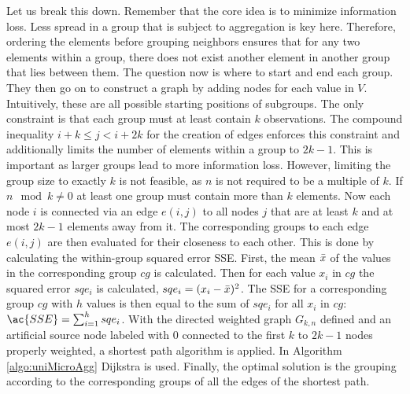 Let us break this down. Remember that the core idea is to minimize information loss. Less spread in a group that is subject to aggregation is key here. Therefore, ordering the elements before grouping neighbors ensures that for any two elements within a group, there does not exist another element in another group that lies between them. The question now is where to start and end each group. They then go on to construct a graph by adding nodes for each value in $V$. Intuitively, these are all possible starting positions of subgroups. The only constraint is that each group must at least contain $k$ observations. The compound inequality $i + k \leq j < i + 2k$ for the creation of edges enforces this constraint and additionally limits the number of elements within a group to $2k - 1$. This is important as larger groups lead to more information loss. However, limiting the group size to exactly $k$ is not feasible, as $n$ is not required to be a multiple of $k$. If $n \mod k \neq 0$ at least one group must contain more than $k$ elements. Now each node $i$ is connected via an edge $e(i,j)$ to all nodes $j$ that are at least $k$ and at most $2k - 1$ elements away from it. The corresponding groups to each edge $e(i,j)$ are then evaluated for their closeness to each other. This is done by calculating the within-group squared error \ac{SSE}. First, the mean $\bar{x}$ of the values in the corresponding group $cg$ is calculated. Then for each value $x_{i}$ in $cg$ the squared error $sqe_i$ is calculated, $sqe_i = (x_i - \bar{x})^2$. The \ac{SSE} for a corresponding group $cg$ with $h$ values is then equal to the sum of $sqe_i$ for all $x_{i}$ in $cg$: $\ac{SSE} = \sum_{i=1}^{h}sqe_i$. With the directed weighted graph $G_{k,n}$ defined and an artificial source node labeled with $0$ connected to the first $k$ to $2k-1$ nodes properly weighted, a shortest path algorithm is applied. In Algorithm \ref{algo:uniMicroAgg} Dijkstra \cite{dijkstra2022note} is used. Finally, the optimal solution is the grouping according to the corresponding groups of all the edges of the shortest path. \par

